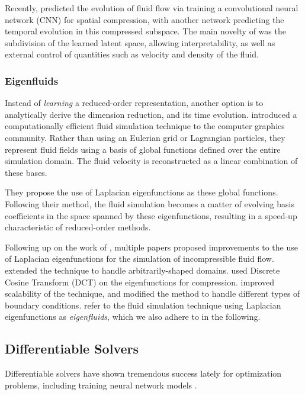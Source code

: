Recently, \citet{LatentSpaceSubdivision} predicted the
evolution of fluid flow via training a convolutional neural network (CNN) for
spatial compression, with another network predicting the temporal evolution in
this compressed subspace.  The main novelty of \cite{LatentSpaceSubdivision} was
the subdivision of the learned latent space, allowing interpretability, as well
as external control of quantities such as velocity and density of the fluid.

\subsubsection*{Eigenfluids}
Instead of \textit{learning} a reduced-order representation, another option is
to analytically derive the dimension reduction, and its time evolution.
\citet{dewitt} introduced a computationally efficient fluid simulation technique
to the computer graphics community. Rather than using an Eulerian grid or
Lagrangian particles, they represent fluid fields using a basis of global
functions defined over the entire simulation domain. The fluid velocity is
reconstructed as a linear combination of these bases.

They propose the use of Laplacian eigenfunctions as these global functions.
Following their method, the fluid simulation becomes a matter of evolving basis
coefficients in the space spanned by these eigenfunctions, resulting in
a speed-up characteristic of reduced-order methods. 

Following up on the work of \citet{dewitt}, multiple papers proposed
improvements to the use of Laplacian eigenfunctions for the simulation of
incompressible fluid flow. \citet{ModelReductionFluidSim} extended the technique
to handle arbitrarily-shaped domains. \citet{EigenfluidCompression} used Discrete
Cosine Transform (DCT) on the eigenfunctions for compression.
\citet{scalable-eigenfluids} improved scalability of the technique, and modified
the method to handle different types of boundary conditions.
\citet{scalable-eigenfluids} refer to the fluid simulation technique using
Laplacian eigenfunctions as \textit{eigenfluids}, which we also adhere to in the
following.

\subsection{Differentiable Solvers}
Differentiable solvers have shown tremendous success lately for optimization
problems, including training neural network models
\cite{holl2019pdecontrol, difftaichi, warp2022}.

